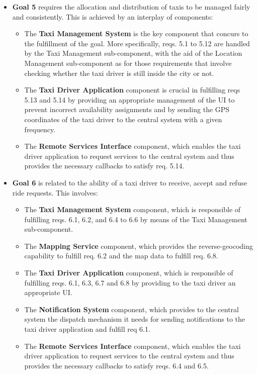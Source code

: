 \begin{itemize}
\begin{itemize}
	\end{itemize}
	\item \textbf{Goal 5} requires the allocation and distribution of taxis to be managed fairly and consistently. This is achieved by an interplay of components: 
	\begin{itemize}
	\item The \textbf{Taxi Management System} is the key component that concurs to the fulfillment of the goal. More specifically, reqs. 5.1 to 5.12 are handled by the Taxi Management sub-component, with the aid of the Location Management sub-component as for those requirements that involve checking whether the taxi driver is still inside the city or not. 
	\item The \textbf{Taxi Driver Application} component is crucial in fulfilling reqs 5.13 and 5.14 by providing an appropriate management of the UI to prevent incorrect availability assignments and by sending the GPS coordinates of the taxi driver to the central system with a given frequency.
	\item The \textbf{Remote Services Interface} component, which enables the taxi driver application to request services to the central system and thus provides the necessary callbacks to satisfy req. 5.14. 	
	\end{itemize}
	\item \textbf{Goal 6} is related to the ability of a taxi driver to receive, accept and refuse ride requests. This involves:
	\begin{itemize}
	\item The \textbf{Taxi Management System} component, which is responsible of fulfilling reqs. 6.1, 6.2, and 6.4 to 6.6 by means of the Taxi Management sub-component.
	\item The \textbf{Mapping Service} component, which provides the reverse-geocoding capability to fulfill req. 6.2 and the map data to fulfill req. 6.8.
	\item The \textbf{Taxi Driver Application} component, which is responsible of fulfilling reqs. 6.1, 6.3, 6.7 and 6.8 by providing to the taxi driver an appropriate UI.
	\item The \textbf{Notification System} component, which provides to the central system the dispatch mechanism it needs for sending notifications to the taxi driver application and fulfill req 6.1.
	\item The \textbf{Remote Services Interface} component, which enables the taxi driver application to request services to the central system and thus provides the necessary callbacks to satisfy reqs. 6.4 and 6.5.

\end{itemize}
\end{itemize}
